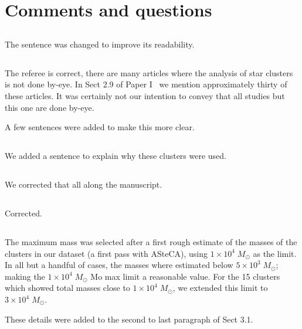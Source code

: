 \documentclass{article}
\begin{document}
\section*{Comments and questions}
\setcounter{subsection}{0}

\subsection{}
The sentence was changed to improve its readability.

\subsection{}
The referee is correct, there are many articles where the analysis of star
clusters is not done by-eye. In Sect 2.9 of Paper I~\citep{Perren_2015} we
mention approximately thirty of these articles. It was certainly not our
intention to convey that all studies but this one are done by-eye.

A few sentences were added to make this more clear.

\subsection{}
We added a sentence to explain why these clusters were used.

\subsection{}
We corrected that all along the manuscript.

\subsection{}
Corrected.

\subsection{}
The maximum mass was selected after a first rough estimate of the masses of the
clusters in our dataset (a first pass with ASteCA), using
$1\times10^4\;M_{\odot}$ as the limit. In all but a handful of cases, the masses
where estimated below $5\times10^3\;M_{\odot}$; making the
$1\times10^4\;M_{\odot}$ Mo max limit a reasonable value. For the 15 clusters
which showed total masses close to $1\times10^4\;M_{\odot}$, we extended this
limit to $3\times10^4\;M_{\odot}$.

These details were added to the second to last paragraph of Sect 3.1.
\end{document}
